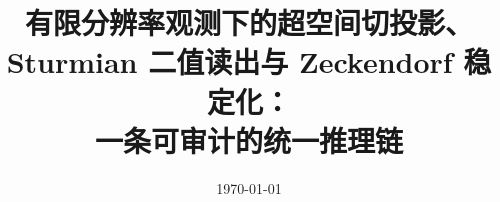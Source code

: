 \documentclass[11pt,letterpaper]{ctexart}
\title{有限分辨率观测下的超空间切投影、Sturmian 二值读出与 Zeckendorf 稳定化：\\\large 一条可审计的统一推理链}
\author{}
\date{\today}
\begin{document}
\maketitle
















\FloatBarrier
\appendix









\FloatBarrier

\end{document}
